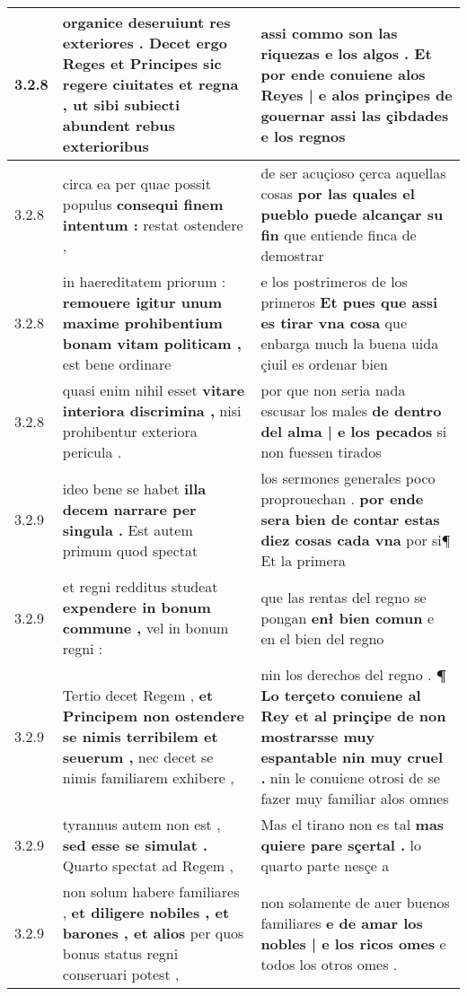 \begin{tabular}{|p{1cm}|p{6.5cm}|p{6.5cm}|}
3.2.8 & organice deseruiunt res exteriores . \textbf{ Decet ergo Reges et Principes sic regere ciuitates et regna , } ut sibi subiecti abundent rebus exterioribus & assi commo son las riquezas e los algos . \textbf{ Et por ende conuiene alos Reyes | e alos prinçipes de gouernar } assi las çibdades e los regnos \\\hline
3.2.8 & circa ea per quae possit populus \textbf{ consequi finem intentum : } restat ostendere , & de ser acuçioso çerca aquellas cosas \textbf{ por las quales el pueblo puede alcançar su fin } que entiende finca de demostrar \\\hline
3.2.8 & in haereditatem priorum : \textbf{ remouere igitur unum maxime prohibentium bonam vitam politicam , } est bene ordinare & e los postrimeros de los primeros \textbf{ Et pues que assi es tirar vna cosa } que enbarga much la buena uida çiuil es ordenar bien \\\hline
3.2.8 & quasi enim nihil esset \textbf{ vitare interiora discrimina , } nisi prohibentur exteriora pericula . & por que non seria nada escusar los males \textbf{ de dentro del alma | e los pecados } si non fuessen tirados \\\hline
3.2.9 & ideo bene se habet \textbf{ illa decem narrare per singula . } Est autem primum quod spectat & los sermones generales poco proprouechan . \textbf{ por ende sera bien de contar estas diez cosas cada vna } por si¶ Et la primera \\\hline
3.2.9 & et regni redditus studeat \textbf{ expendere in bonum commune , } vel in bonum regni : & que las rentas del regno se pongan \textbf{ enł bien comun } e en el bien del regno \\\hline
3.2.9 & Tertio decet Regem , \textbf{ et Principem non ostendere se nimis terribilem et seuerum , } nec decet se nimis familiarem exhibere , & nin los derechos del regno . \textbf{ ¶ Lo terçeto conuiene al Rey et al prinçipe de non mostrarsse muy espantable nin muy cruel . } nin le conuiene otrosi de se fazer muy familiar alos omnes \\\hline
3.2.9 & tyrannus autem non est , \textbf{ sed esse se simulat . } Quarto spectat ad Regem , & Mas el tirano non es tal \textbf{ mas quiere pare sçertal . } lo quarto parte nesçe a \\\hline
3.2.9 & non solum habere familiares , \textbf{ et diligere nobiles , et barones , et alios } per quos bonus status regni conseruari potest , & non solamente de auer buenos familiares \textbf{ e de amar los nobles | e los ricos omes } e todos los otros omes . \\\hline

\end{tabular}
